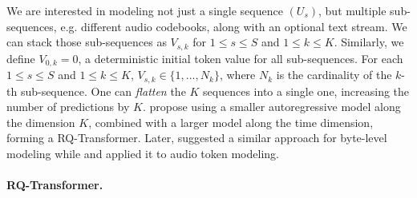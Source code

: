 We are interested in modeling not just a single sequence $(U_s)$, but multiple sub-sequences, e.g. different audio codebooks, along with an optional text stream. We can stack those sub-sequences as $V_{s, k}$ for $1 \leq s \leq S$ and $1 \leq k \leq K$.
Similarly, we define $V_{0, k} = 0$, a deterministic initial token value for all sub-sequences.
For each $1 \leq s\leq S$ and $1 \leq k\leq K$, $V_{s, k} \in \{1, \ldots, N_k\}$, where $N_k$ is the cardinality of the $k$-th sub-sequence. One can \emph{flatten} the $K$ sequences into a single one, increasing the number of predictions by $K$.
\citet{rqtransformer} propose using a smaller autoregressive model along the dimension $K$, combined with a larger model along the time dimension, forming a RQ-Transformer. Later, \citet{yu2024megabyte} suggested a similar approach for byte-level modeling while \citet{uniaudio} and \citet{zhu2024generativepretrainedspeechlanguage} applied it to audio token modeling.

\paragraph{RQ-Transformer.}

